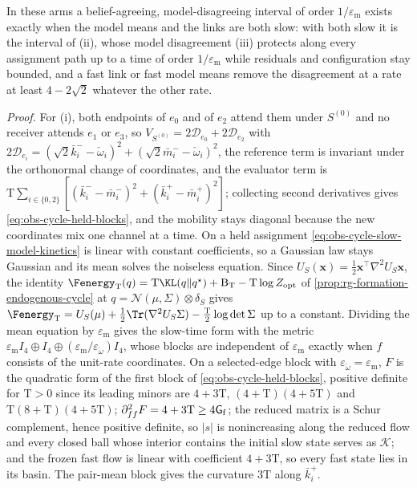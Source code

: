 In these arms a belief-agreeing, model-disagreeing interval of order
$1/\varepsilon_{\mathrm m}$ exists exactly when the model means and the links are
both slow: with both slow it is the interval of (ii), whose model disagreement
(iii) protects along every assignment path up to a time of order
$1/\varepsilon_{\mathrm m}$ while residuals and configuration stay bounded, and a
fast link or fast model means remove the disagreement at a rate at least
$4-2\sqrt2$ whatever the other rate. 

\noindent\emph{Proof.}
For (i), both endpoints of $e_0$ and of $e_2$ attend them under $S^{(0)}$ and no
receiver attends $e_1$ or $e_3$, so $V_{S^{(0)}}=2\mathcal D_{e_0}+2\mathcal D_{e_2}$
with $2\mathcal D_{e_i}=(\sqrt2\bar k^-_i-\check\omega_i)^2+(\sqrt2\bar m^-_i-\check\omega_i)^2$,
the reference term is invariant under the orthonormal change of coordinates, and
the evaluator term is
$\mathrm T\sum_{i\in\{0,2\}}[(\bar k^-_i-\bar m^-_i)^2+(\bar k^+_i-\bar m^+_i)^2]$;
collecting second derivatives gives \eqref{eq:obs-cycle-held-blocks}, and the
mobility stays diagonal because the new coordinates mix one channel at a time. On a
held assignment \eqref{eq:obs-cycle-slow-model-kinetics} is linear with constant
coefficients, so a Gaussian law stays Gaussian and its mean solves the noiseless
equation. Since $U_S(\mathbf x)=\frac12\mathbf x^\top\nabla^2U_S\mathbf x$, the
identity
$\Fenergy_{\mathrm T}(q)=\mathrm T\KL(q\Vert q^\star)+\mathrm B_{\mathrm T}-\mathrm T\log Z_{\mathrm{opt}}$
of \cref{prop:rg-formation-endogenous-cycle} at $q=\mathcal N(\mu,\Sigma)\otimes\delta_S$
gives $\Fenergy_{\mathrm T}=U_S(\mu)+\frac12\Tr(\nabla^2U_S\Sigma)-\frac{\mathrm T}2\log\det\Sigma$
up to a constant. Dividing the mean equation by $\varepsilon_{\mathrm m}$ gives the
slow-time form with the metric
$\varepsilon_{\mathrm m}I_4\oplus I_4\oplus(\varepsilon_{\mathrm m}/\varepsilon_{\check\omega})I_4$,
whose blocks are independent of $\varepsilon_{\mathrm m}$ exactly when $f$ consists
of the unit-rate coordinates. On a selected-edge block with
$\varepsilon_{\check\omega}=\varepsilon_{\mathrm m}$, $F$ is the quadratic form of the first
block of \eqref{eq:obs-cycle-held-blocks}, positive definite for $\mathrm T>0$ since
its leading minors are $4+3\mathrm T$, $(4+\mathrm T)(4+5\mathrm T)$ and
$\mathrm T(8+\mathrm T)(4+5\mathrm T)$; $\partial^2_{ff}F=4+3\mathrm T\ge4\mathsf G_{\rm f}$;
the reduced matrix is a Schur complement, hence positive definite, so $|s|$ is
nonincreasing along the reduced flow and every closed ball whose interior contains
the initial slow state serves as $\mathcal K$; and the frozen fast flow is linear
with coefficient $4+3\mathrm T$, so every fast state lies in its basin. The
pair-mean block gives the curvature $3\mathrm T$ along $\bar k^+_i$.

